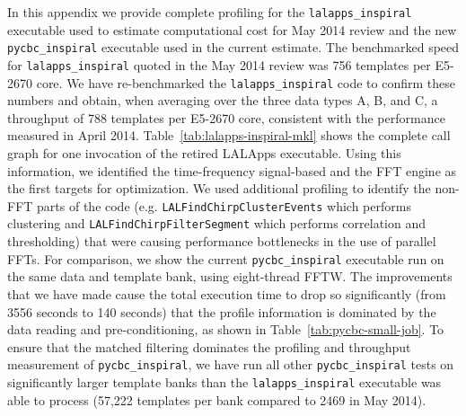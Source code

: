In this appendix we provide complete profiling for the
\texttt{lalapps\_inspiral} executable used to estimate computational cost for
May 2014 review and the new \texttt{pycbc\_inspiral} executable used in the
current estimate. The benchmarked speed for \texttt{lalapps\_inspiral} quoted
in the May 2014 review was 756 templates per E5-2670 core. We have
re-benchmarked the \texttt{lalapps\_inspiral} code to confirm these numbers
and obtain, when averaging over the three data types A, B, and C, a throughput
of 788 templates per E5-2670 core, consistent with the performance measured in
April 2014. Table~\ref{tab:lalapps-inspiral-mkl} shows the complete call graph
for one invocation of the retired LALApps executable. Using this information, we
identified the time-frequency signal-based and the FFT engine as the first
targets for optimization. We used additional profiling to identify the non-FFT
parts of the code (e.g.  \texttt{LALFindChirpClusterEvents} which performs
clustering and \texttt{LALFindChirpFilterSegment} which performs correlation
and thresholding) that were causing performance bottlenecks in the use of
parallel FFTs. For comparison, we show the current \texttt{pycbc\_inspiral}
executable run on the same data and template bank, using eight-thread FFTW.
The improvements that we have made cause the total execution time to drop so
significantly  (from 3556 seconds to 140 seconds) that the profile information
is dominated by the data reading and pre-conditioning, as shown in
Table~\ref{tab:pycbc-small-job}.  To ensure that the matched filtering
dominates the profiling and throughput measurement of
\texttt{pycbc\_inspiral},
we have run all other \texttt{pycbc\_inspiral} tests on significantly larger template banks than the
\texttt{lalapps\_inspiral} executable was able to process (57,222 templates per
bank compared to 2469  in May 2014).

